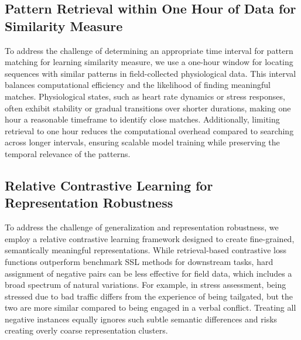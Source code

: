 \subsection{Pattern Retrieval within One Hour of Data for Similarity Measure}

To address the challenge of determining an appropriate time interval for pattern matching for learning similarity measure, we use a one-hour window for locating sequences with similar patterns in field-collected physiological data. This interval balances computational efficiency and the likelihood of finding meaningful matches. Physiological states, such as heart rate dynamics or stress responses, often exhibit stability or gradual transitions over shorter durations, making one hour a reasonable timeframe to identify close matches. Additionally, limiting retrieval to one hour reduces the computational overhead compared to searching across longer intervals, ensuring scalable model training while preserving the temporal relevance of the patterns.

\subsection{Relative Contrastive Learning for Representation Robustness}\label{sec:relative_contrastive_loss}
To address the challenge of generalization and representation robustness, we employ a relative contrastive learning framework designed to create fine-grained, semantically meaningful representations. While retrieval-based contrastive loss functions outperform benchmark SSL methods for downstream tasks, hard assignment of negative pairs can be less effective for field data, which includes a broad spectrum of natural variations. For example, in stress assessment, being stressed due to bad traffic differs from the experience of being tailgated, but the two are more similar compared to being engaged in a verbal conflict. Treating all negative instances equally ignores such subtle semantic differences and risks creating overly coarse representation clusters.

